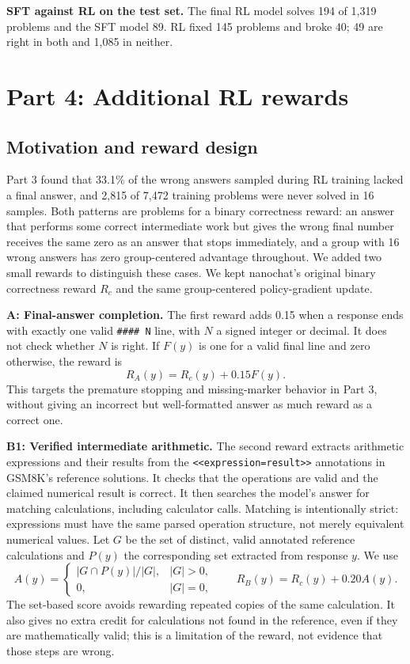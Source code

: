 \documentclass[10pt]{article}
\newcommand{\code}[1]{\texttt{#1}}
\begin{document}
\textbf{SFT against RL on the test set.} The final RL model solves 194 of 1{,}319 problems and the SFT model 89. RL fixed 145 problems and broke 40; 49 are right in both and 1{,}085 in neither.

\section*{Part 4: Additional RL rewards}

\subsection*{Motivation and reward design}
Part 3 found that 33.1\% of the wrong answers sampled during RL training lacked a final answer, and 2{,}815 of 7{,}472 training problems were never solved in 16 samples. Both patterns are problems for a binary correctness reward: an answer that performs some correct intermediate work but gives the wrong final number receives the same zero as an answer that stops immediately, and a group with 16 wrong answers has zero group-centered advantage throughout. We added two small rewards to distinguish these cases. We kept nanochat's original binary correctness reward $R_c$ and the same group-centered policy-gradient update.

\textbf{A: Final-answer completion.} The first reward adds 0.15 when a response ends with exactly one valid \code{\#\#\#\# N} line, with $N$ a signed integer or decimal. It does not check whether $N$ is right. If $F(y)$ is one for a valid final line and zero otherwise, the reward is
\[
R_A(y)=R_c(y)+0.15F(y).
\]
This targets the premature stopping and missing-marker behavior in Part 3, without giving an incorrect but well-formatted answer as much reward as a correct one.

\textbf{B1: Verified intermediate arithmetic.} The second reward extracts arithmetic expressions and their results from the \code{<<expression=result>>} annotations in GSM8K's reference solutions. It checks that the operations are valid and the claimed numerical result is correct. It then searches the model's answer for matching calculations, including calculator calls. Matching is intentionally strict: expressions must have the same parsed operation structure, not merely equivalent numerical values. Let $G$ be the set of distinct, valid annotated reference calculations and $P(y)$ the corresponding set extracted from response $y$. We use
\[
A(y)=
\begin{cases}
|G\cap P(y)|/|G|,& |G|>0,\\
0,& |G|=0,
\end{cases}
\qquad
R_B(y)=R_c(y)+0.20A(y).
\]
The set-based score avoids rewarding repeated copies of the same calculation. It also gives no extra credit for calculations not found in the reference, even if they are mathematically valid; this is a limitation of the reward, not evidence that those steps are wrong.
\end{document}
